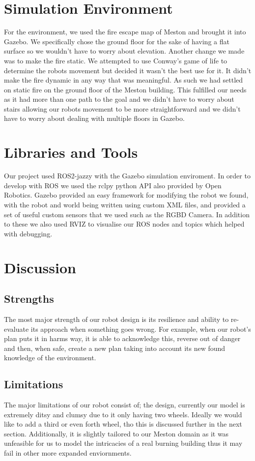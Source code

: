\documentclass[12pt,a4paper,twoside]{article}
\begin{document}
\section{Simulation Environment}

For the environment, we used the fire escape map of Meston and brought 
it into Gazebo. We specifically chose the ground floor for the sake of 
having a flat surface so we wouldn't have to worry about elevation. 
Another change we made was to make the fire static. We attempted to use 
Conway's game of life to determine the robots movement but decided it 
wasn't the best use for it. It didn't make the fire dynamic in any way 
that was meaningful. As such we had settled on static fire on the ground 
floor of the Meston building. This fulfilled our needs as it had more than 
one path to the goal and we didn't have to worry about stairs allowing 
our robots movement to be more straightforward and we didn't have to worry about 
dealing with multiple floors in Gazebo. 

\section{Libraries and Tools}
Our project used ROS2-jazzy with the Gazebo simulation enviroment. In order to develop with ROS we used the rclpy python API 
also provided by Open Robotics. Gazebo provided an easy framework for modifying the robot 
we found, with the robot and world being written using custom XML files, and 
provided a set of useful custom sensors that we used such as the RGBD Camera. 
In addition to these we also used RVIZ \cite{rviz} to visualise our ROS nodes and topics which helped 
with debugging.

\section{Discussion}

\subsection{Strengths}
The most major strength of our robot design is its resilience and ability 
to re-evaluate its approach when something goes wrong. For example, when 
our robot's plan puts it in harms way, it is able to acknowledge this, reverse 
out of danger and then, when safe, create a new plan taking into account its new 
found knowledge of the environment. 

\subsection{Limitations}
The major limitations of our robot consist of; the design, currently our model is 
extremely ditsy and clumsy due to it only having two wheels. Ideally we would like 
to add a third or even forth wheel, tho this is discussed further in the next section. 
Additionally, it is slightly tailored to our Meston domain as it was unfeasible for us 
to model the intricacies of a real burning building thus it may fail in other more expanded 
enviornments. 
\end{document}
